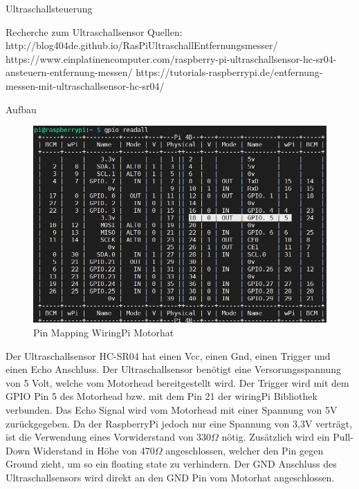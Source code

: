 \documentclass[12pt,twoside]{report}
\begin{document}
\begin{section}{Ultraschallsteuerung}
    \begin{subsection}{Recherche zum Ultraschallsensor}
        Quellen:
        http://blog404de.github.io/RasPiUltraschallEntfernungsmesser/
        https://www.einplatinencomputer.com/raspberry-pi-ultraschallsensor-hc-sr04-ansteuern-entfernung-messen/
        https://tutorials-raspberrypi.de/entfernung-messen-mit-ultraschallsensor-hc-sr04/
    \end{subsection}
    \begin{subsection}{Aufbau}
        \begin{figure}[h!]
              \includegraphics[width=\linewidth]{lernportfolio_assets/GPIO_Pins}
              \caption{Pin Mapping WiringPi Motorhat}
              \label{fig:boat1}
        \end{figure}
        Der Ultraschallsensor HC-SR04 hat einen Vcc, einen Gnd, einen Trigger und einen Echo Anschluss.
        Der Ultraschallsensor benötigt eine Versorungsspannung von 5 Volt,
        welche vom Motorhead bereitgestellt wird.
        Der Trigger wird mit dem GPIO Pin 5 des Motorhead bzw. mit dem Pin 21 der wiringPi Bibliothek verbunden.
        Das Echo Signal wird vom Motorhead mit einer Spannung von 5V
        zurückgegeben. Da der RaspberryPi jedoch nur eine Spannung von 3,3V
        verträgt, ist die Verwendung eines Vorwiderstand von 330$\Omega$ nötig.
        Zusätzlich wird ein Pull-Down Widerstand in Höhe von 470$\Omega$
        angeschlossen, welcher den Pin gegen Ground zieht, um so ein floating state zu verhindern.
        Der GND Anschluss des Ultraschallsensors wird direkt an den GND Pin vom Motorhat angeschlossen.


\end{subsection}
\end{section}
\end{document}
